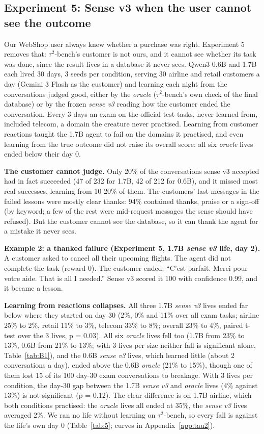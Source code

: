 \subsection{Experiment 5: Sense v3 when the user cannot see the outcome}\label{sec:e5}

Our WebShop user always knew whether a purchase was right. Experiment 5 removes that: $\tau^2$-bench's customer is not ours, and it cannot see whether its task was done, since the result lives in a database it never sees. Qwen3 0.6B and 1.7B each lived 30 days, 3 seeds per condition, serving 30 airline and retail customers a day (Gemini 3 Flash as the customer) and learning each night from the conversations judged good, either by the \emph{oracle} ($\tau^2$-bench's own check of the final database) or by the frozen \emph{sense v3} reading how the customer ended the conversation. Every 3 days an exam on the official test tasks, never learned from, included telecom, a domain the creature never practised. Learning from customer reactions taught the 1.7B agent to fail on the domains it practised, and even learning from the true outcome did not raise its overall score: all six \emph{oracle} lives ended below their day 0.

\textbf{The customer cannot judge.} Only 20\% of the conversations sense v3 accepted had in fact succeeded (47 of 232 for 1.7B, 42 of 212 for 0.6B), and it missed most real successes, learning from 10-20\% of them. The customers' last messages in the failed lessons were mostly clear thanks: 94\% contained thanks, praise or a sign-off (by keyword; a few of the rest were mid-request messages the sense should have refused). But the customer cannot see the database, so it can thank the agent for a mistake it never sees.

\textbf{Example 2: a thanked failure (Experiment 5, 1.7B \emph{sense v3} life, day 2).} A customer asked to cancel all their upcoming flights. The agent did not complete the task (reward 0). The customer ended: ``C'est parfait. Merci pour votre aide. That is all I needed.'' Sense v3 scored it 100 with confidence 0.99, and it became a lesson.

\textbf{Learning from reactions collapses.} All three 1.7B \emph{sense v3} lives ended far below where they started on day 30 (2\%, 0\% and 11\% over all exam tasks; airline 25\% to 2\%, retail 11\% to 3\%, telecom 33\% to 8\%; overall 23\% to 4\%, paired t-test over the 3 lives, p = 0.03). All six \emph{oracle} lives fell too (1.7B from 23\% to 13\%, 0.6B from 21\% to 13\%; with 3 lives per size neither fall is significant alone, Table~\ref{tab:B1}), and the 0.6B \emph{sense v3} lives, which learned little (about 2 conversations a day), ended above the 0.6B \emph{oracle} (21\% to 15\%), though one of them lost 15 of its 100 day-30 exam conversations to breakage. With 3 lives per condition, the day-30 gap between the 1.7B \emph{sense v3} and \emph{oracle} lives (4\% against 13\%) is not significant (p = 0.12). The clear difference is on 1.7B airline, which both conditions practised: the \emph{oracle} lives all ended at 35\%, the \emph{sense v3} lives averaged 2\%. We ran no life without learning on $\tau^2$-bench, so every fall is against the life's own day 0 (Table~\ref{tab:5}; curves in Appendix~\ref{app:tau2}).


